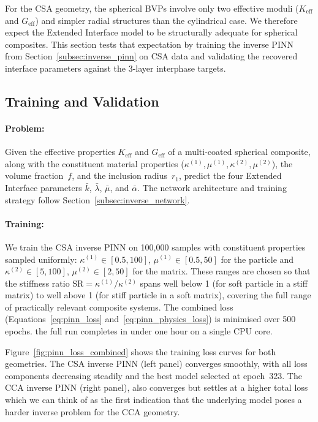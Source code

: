\documentclass[oneside, 12pt, a4paper, bibliography=totoc]{book}
\begin{document}
For the CSA geometry, the spherical BVPs involve only two effective moduli ($K_{\text{eff}}$ and $G_{\text{eff}}$) and simpler radial structures than the cylindrical case. We therefore expect the Extended Interface model to be structurally adequate for spherical composites. This section tests that expectation by training the inverse PINN from Section~\ref{subsec:inverse_pinn} on CSA data and validating the recovered interface parameters against the 3-layer interphase targets.

\subsection{Training and Validation}
\label{subsec:csa_pinn}

\paragraph{Problem:} Given the effective properties $K_{\text{eff}}$ and $G_{\text{eff}}$ of a multi-coated spherical composite, along with the constituent material properties ($\kappa^{(1)}, \mu^{(1)}, \kappa^{(2)}, \mu^{(2)}$), the volume fraction~$f$, and the inclusion radius~$r_1$, predict the four Extended Interface parameters $\bar{k}$, $\bar{\lambda}$, $\bar{\mu}$, and $\bar{\alpha}$. The network architecture and training strategy follow Section~\ref{subsec:inverse_network}.

\paragraph{Training:}
We train the CSA inverse PINN on 100,000 samples with constituent properties sampled uniformly: $\kappa^{(1)} \in [0.5, 100]$, $\mu^{(1)} \in [0.5, 50]$ for the particle and $\kappa^{(2)} \in [5, 100]$, $\mu^{(2)} \in [2, 50]$ for the matrix. These ranges are chosen so that the stiffness ratio $\text{SR} = \kappa^{(1)}/\kappa^{(2)}$ spans well below 1 (for soft particle in a stiff matrix) to well above 1 (for stiff particle in a soft matrix), covering the full range of practically relevant composite systems. The combined loss (Equations~\eqref{eq:pinn_loss} and~\eqref{eq:pinn_physics_loss}) is minimised over 500 epochs. the full run completes in under one hour on a single CPU core.

Figure~\ref{fig:pinn_loss_combined} shows the training loss curves for both geometries. The CSA inverse PINN (left panel) converges smoothly, with all loss components decreasing steadily and the best model selected at epoch~323. The CCA inverse PINN (right panel), also converges but settles at a higher total loss which we can think of as the first indication that the underlying model poses a harder inverse problem for the CCA geometry.
\end{document}
